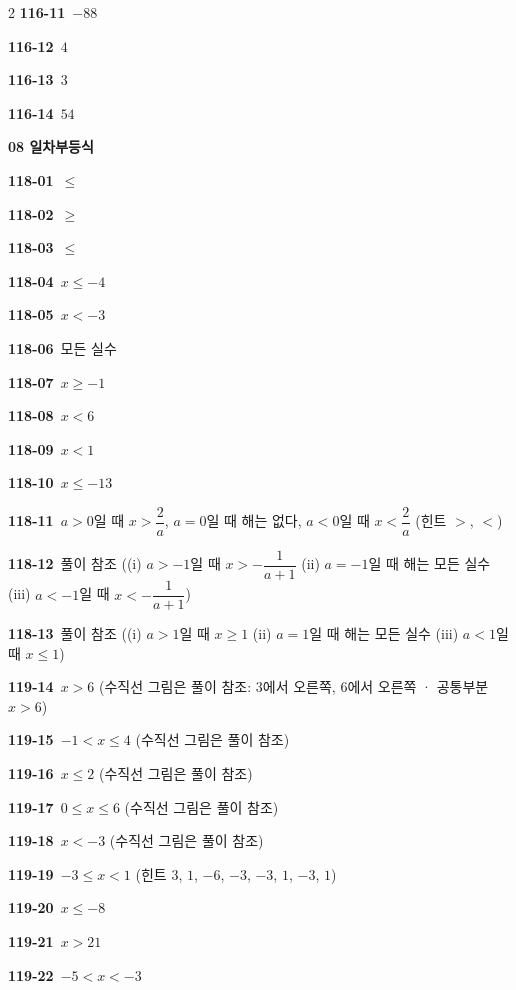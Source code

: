 \documentclass[10pt,a4paper]{article}
\begin{document}
\begin{multicols}{2}
\noindent\textbf{116-11}\ $-88$\par
\noindent\textbf{116-12}\ $4$\par
\noindent\textbf{116-13}\ $3$\par
\noindent\textbf{116-14}\ $54$\par
\noindent\textbf{08 일차부등식}\par\smallskip
\noindent\textbf{118-01}\ $\le$\par
\noindent\textbf{118-02}\ $\ge$\par
\noindent\textbf{118-03}\ $\le$\par
\noindent\textbf{118-04}\ $x\le -4$\par
\noindent\textbf{118-05}\ $x<-3$\par
\noindent\textbf{118-06}\ 모든 실수\par
\noindent\textbf{118-07}\ $x\ge -1$\par
\noindent\textbf{118-08}\ $x<6$\par
\noindent\textbf{118-09}\ $x<1$\par
\noindent\textbf{118-10}\ $x\le -13$\par
\noindent\textbf{118-11}\ $a>0$일 때 $x>\dfrac{2}{a}$, $a=0$일 때 해는 없다, $a<0$일 때 $x<\dfrac{2}{a}$ (힌트 $>$, $<$)\par
\noindent\textbf{118-12}\ 풀이 참조 ((i) $a>-1$일 때 $x>-\dfrac{1}{a+1}$ (ii) $a=-1$일 때 해는 모든 실수 (iii) $a<-1$일 때 $x<-\dfrac{1}{a+1}$)\par
\noindent\textbf{118-13}\ 풀이 참조 ((i) $a>1$일 때 $x\ge 1$ (ii) $a=1$일 때 해는 모든 실수 (iii) $a<1$일 때 $x\le 1$)\par
\noindent\textbf{119-14}\ $x>6$ (수직선 그림은 풀이 참조: $3$에서 오른쪽, $6$에서 오른쪽 · 공통부분 $x>6$)\par
\noindent\textbf{119-15}\ $-1<x\le 4$ (수직선 그림은 풀이 참조)\par
\noindent\textbf{119-16}\ $x\le 2$ (수직선 그림은 풀이 참조)\par
\noindent\textbf{119-17}\ $0\le x\le 6$ (수직선 그림은 풀이 참조)\par
\noindent\textbf{119-18}\ $x<-3$ (수직선 그림은 풀이 참조)\par
\noindent\textbf{119-19}\ $-3\le x<1$ (힌트 $3$, $1$, $-6$, $-3$, $-3$, $1$, $-3$, $1$)\par
\noindent\textbf{119-20}\ $x\le -8$\par
\noindent\textbf{119-21}\ $x>21$\par
\noindent\textbf{119-22}\ $-5<x<-3$\par

\end{multicols}
\end{document}
